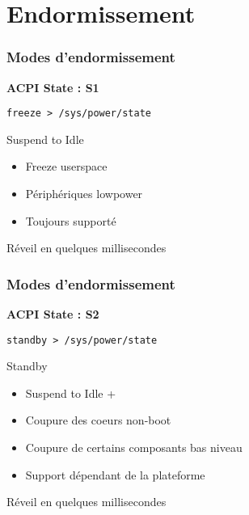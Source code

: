 \section{Endormissement}

\begin{frame}
	\frametitle{Modes d'endormissement}
	\textbf{ACPI State : S1}

	\texttt{freeze > /sys/power/state}
	\begin{block}{Suspend to Idle}
		\begin{itemize}
			\item Freeze userspace
			\item Périphériques lowpower
			\item Toujours supporté
		\end{itemize}
	\end{block}
	Réveil en quelques millisecondes
\end{frame}
\begin{frame}
	\frametitle{Modes d'endormissement}
	\textbf{ACPI State : S2}

	\texttt{standby > /sys/power/state}
	\begin{block}{Standby}
		\begin{itemize}
			\item Suspend to Idle +
			\item Coupure des coeurs non-boot
			\item Coupure de certains composants bas niveau
			\item Support dépendant de la plateforme
		\end{itemize}
	\end{block}
	Réveil en quelques millisecondes
\end{frame}

